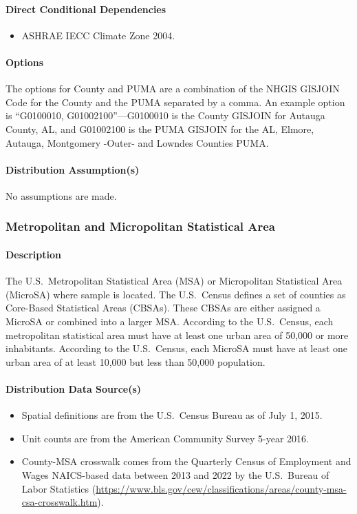 \paragraph{Direct Conditional Dependencies}
\begin{itemize}
    \item ASHRAE IECC Climate Zone 2004.
\end{itemize}
\paragraph{Options}
The options for County and PUMA are a combination of the NHGIS GISJOIN Code for the County and the PUMA separated by a comma. An example option is ``G0100010, G01002100''---G0100010 is the County GISJOIN for Autauga County, AL, and G01002100 is the PUMA GISJOIN for the AL, Elmore, Autauga, Montgomery -Outer- and Lowndes Counties PUMA.

\paragraph{Distribution Assumption(s)}
No assumptions are made.

\subsubsection{Metropolitan and Micropolitan Statistical Area}
\paragraph{Description}
The U.S.~Metropolitan Statistical Area (MSA) or Micropolitan Statistical Area (MicroSA) where sample is located. The U.S.~Census defines a set of counties as Core-Based Statistical Areas (CBSAs). These CBSAs are either assigned a MicroSA or combined into a larger MSA. According to the U.S.~Census, each metropolitan statistical area must have at least one urban area of 50,000 or more inhabitants. According to the U.S.~Census, each MicroSA must have at least one urban area of at least 10,000 but less than 50,000 population.

\paragraph{Distribution Data Source(s)}
\begin{itemize}
 
\item
  Spatial definitions are from the U.S.~Census Bureau as of July 1,
  2015.
\item
  Unit counts are from the American Community Survey 5-year 2016.
\item
  County-MSA crosswalk comes from the Quarterly Census of Employment and
  Wages NAICS-based data between 2013 and 2022 by the U.S.~Bureau of Labor
  Statistics
  (\url{https://www.bls.gov/cew/classifications/areas/county-msa-csa-crosswalk.htm}).
\end{itemize}

